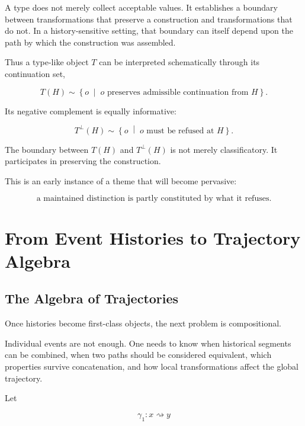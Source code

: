 \documentclass[11pt]{article}
\theoremstyle{remark}
\begin{document}
A type does not merely collect acceptable values. It establishes a boundary between transformations that preserve a construction and transformations that do not. In a history-sensitive setting, that boundary can itself depend upon the path by which the construction was assembled.

Thus a type-like object $T$ can be interpreted schematically through its continuation set,

\begin{equation}
T(H)
\sim
\left\{
o
\;\middle|\;
o \text{ preserves admissible continuation from }H
\right\}.
\end{equation}

Its negative complement is equally informative:

\begin{equation}
T^{\perp}(H)
\sim
\left\{
o
\;\middle|\;
o \text{ must be refused at }H
\right\}.
\end{equation}

The boundary between $T(H)$ and $T^{\perp}(H)$ is not merely classificatory. It participates in preserving the construction.

This is an early instance of a theme that will become pervasive:

\begin{equation}
\boxed{
\text{a maintained distinction is partly constituted by what it refuses.}
}
\end{equation}

\section{From Event Histories to Trajectory Algebra}

\subsection{The Algebra of Trajectories}

Once histories become first-class objects, the next problem is compositional.

Individual events are not enough. One needs to know when historical segments can be combined, when two paths should be considered equivalent, which properties survive concatenation, and how local transformations affect the global trajectory.

Let

\begin{equation}
\gamma_1:x\rightsquigarrow y
\end{equation}
\end{document}
